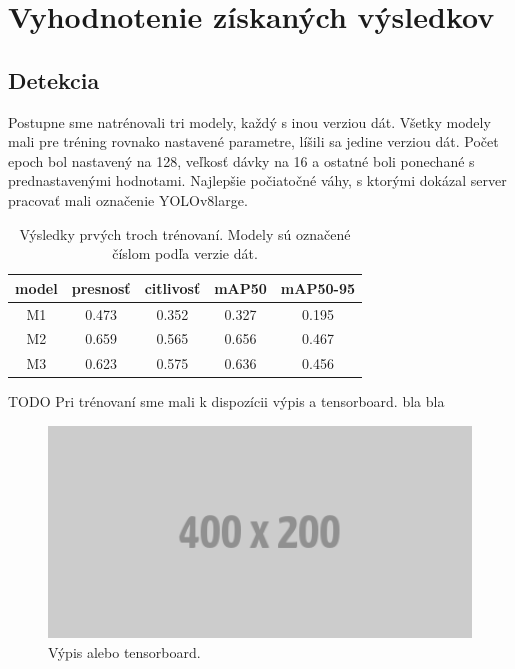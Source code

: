 \chapter{Vyhodnotenie získaných výsledkov}\label{chap:results}

\section{Detekcia}

Postupne sme natrénovali tri modely, každý s inou verziou dát. Všetky modely mali pre tréning rovnako nastavené parametre, líšili sa jedine verziou dát. Počet epoch bol nastavený na 128, veľkosť dávky na 16 a ostatné boli ponechané s prednastavenými hodnotami. Najlepšie počiatočné váhy, s ktorými dokázal server pracovať mali označenie YOLOv8large.
\\
\begin{table}[ht]
\centering
\begin{tabular}{ |c c c c c|  }
\hline
model  &  presnosť & citlivosť & mAP50 & mAP50-95 \\
\hline
M1  & 0.473 & 0.352	& 0.327	& 0.195 \\
M2  & 0.659 & 0.565 & 0.656 & 0.467 \\
M3  & 0.623 & 0.575 & 0.636 & 0.456 \\
\hline
\end{tabular}
\caption{Výsledky prvých troch trénovaní. Modely sú označené číslom podľa verzie dát.}
\label{table:test1}
\end{table}

TODO Pri trénovaní sme mali k dispozícii výpis a tensorboard. bla bla
\\
\begin{figure}[ht]
    \centering
    \includegraphics[width=1\textwidth]{images/02/placeholder.png}
    \caption{Výpis alebo tensorboard.}
    \label{img:lab}
\end{figure}

